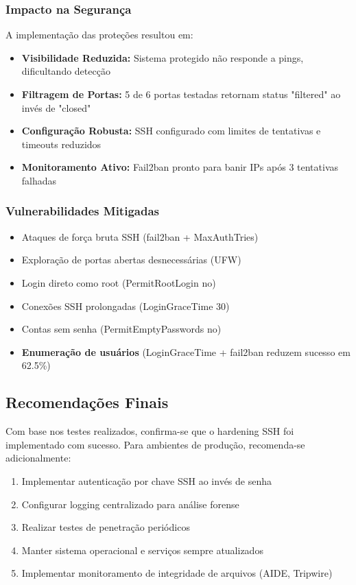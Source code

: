\documentclass[12pt]{article}
\begin{document}
\subsubsection{Impacto na Segurança}
A implementação das proteções resultou em:
\begin{itemize}
    \item \textbf{Visibilidade Reduzida:} Sistema protegido não responde a pings, dificultando detecção
    \item \textbf{Filtragem de Portas:} 5 de 6 portas testadas retornam status "filtered" ao invés de "closed"
    \item \textbf{Configuração Robusta:} SSH configurado com limites de tentativas e timeouts reduzidos
    \item \textbf{Monitoramento Ativo:} Fail2ban pronto para banir IPs após 3 tentativas falhadas
\end{itemize}

\subsubsection{Vulnerabilidades Mitigadas}
\begin{itemize}
    \item Ataques de força bruta SSH (fail2ban + MaxAuthTries)
    \item Exploração de portas abertas desnecessárias (UFW)
    \item Login direto como root (PermitRootLogin no)
    \item Conexões SSH prolongadas (LoginGraceTime 30)
    \item Contas sem senha (PermitEmptyPasswords no)
    \item \textbf{Enumeração de usuários} (LoginGraceTime + fail2ban reduzem sucesso em 62.5\%)
\end{itemize}

\subsection{Recomendações Finais}

Com base nos testes realizados, confirma-se que o hardening SSH foi implementado com sucesso. Para ambientes de produção, recomenda-se adicionalmente:
\begin{enumerate}
    \item Implementar autenticação por chave SSH ao invés de senha
    \item Configurar logging centralizado para análise forense
    \item Realizar testes de penetração periódicos
    \item Manter sistema operacional e serviços sempre atualizados
    \item Implementar monitoramento de integridade de arquivos (AIDE, Tripwire)
\end{enumerate}
\end{document}

